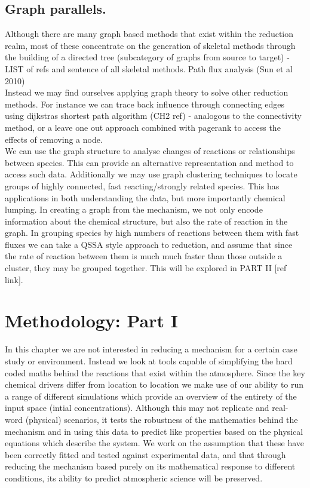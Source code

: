 \documentclass{pasa}%
\begin{document}
\subsection{Graph parallels. }
Although there are many graph based methods that exist within the reduction realm, most of these concentrate on the generation of skeletal methods through the building of a directed tree (subcategory of graphs from source to target) - LIST of refs and sentence of all skeletal methods. Path flux analysis (Sun et al 2010)\\

Instead we may find ourselves applying graph theory to solve other reduction methods. For instance we can trace back influence through connecting edges using dijkstras shortest path algorithm (CH2 ref) - analogous to the connectivity method, or a leave one out approach combined with pagerank to access the effects of removing a node.\\

We can use the graph structure to analyse changes of reactions or relationships between species. This can provide an alternative representation and method to access such data. Additionally we may use graph clustering techniques to locate groups of highly connected, fast reacting/strongly related species. This has applications in both understanding the data, but more importantly chemical lumping. In creating a graph from the mechanism, we not only encode information about the chemical structure, but also the rate of reaction in the graph. In grouping species by high numbers of reactions between them with fast fluxes we can take a QSSA style approach to reduction, and assume that since the rate of reaction between them is much much faster than those outside a cluster, they may be grouped together. This will be explored in PART II [ref link].



\section{Methodology: Part I }
In this chapter we are not interested in reducing a mechanism for a certain case study or environment. Instead we look at tools capable of simplifying the hard coded maths behind the reactions that exist within the atmosphere. Since the key chemical drivers differ from location to location we make use of our ability to run a range of different simulations which provide an overview of the entirety of the input space (intial concentrations). Although this may not replicate and real-word (physical) scenarios, it tests the robustness of the mathematics behind the mechanism and in using this data to predict like properties based on the physical equations which describe the system. We work on the assumption that these have been correctly fitted and tested against experimental data, and that through reducing the mechanism based purely on its mathematical response to different conditions, its ability to predict atmospheric science will be preserved. \\
\end{document}
